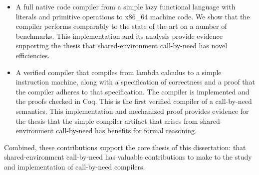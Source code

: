\begin{itemize}
\item A full native code compiler from a simple lazy functional language with
literals and primitive operations to x86\_64 machine code. We show that the
compiler performs comparably to the state of the art on a number of benchmarks.
This implementation and its analysis provide evidence supporting the thesis that
shared-environment call-by-need has novel efficiencies.

\item A verified compiler that compiles from lambda calculus to a simple
instruction machine, along with a specification of correctness and a proof that
the compiler adheres to that specification. The compiler is implemented and the
proofs checked in Coq. This is the first verified compiler of a call-by-need
semantics. This implementation and mechanized proof provides evidence for the
thesis that the simple compiler artifact that arises from shared-environment
call-by-need has benefits for formal reasoning.
\end{itemize}

Combined, these contributions support the core thesis of this dissertation: that
shared-environment call-by-need has valuable contributions to make to the study
and implementation of call-by-need compilers.
